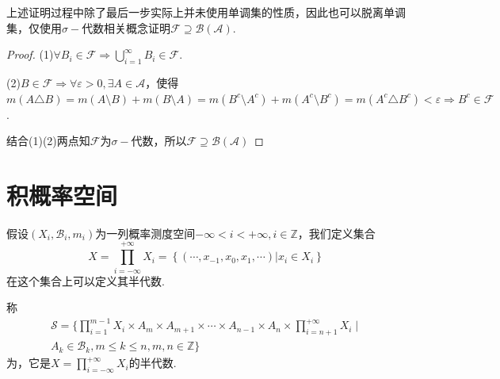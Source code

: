 \begin{remark}
    上述证明过程中除了最后一步实际上并未使用单调集的性质，因此也可以脱离单调集，仅使用$\sigma-\!\!$代数相关概念证明$\mathcal{F} \supseteq \mathcal{B}(\mathcal{A})$.\par
    \begin{proof}
        (1)$\forall B_i \in \mathcal{F} \Rightarrow \bigcup_{i=1}^\infty{B_i} \in \mathcal{F}$.\par
        (2)$B \in \mathcal{F} \Rightarrow \forall \varepsilon>0,\exists A \in \mathcal{A}$，使得$m(A \triangle B)=m(A \setminus B)+m(B \setminus A)=m(B^c \setminus A^c)+m(A^c\setminus B^c)=m(A^c \triangle B^c)<\varepsilon \Rightarrow B^c \in \mathcal{F}$.\par
        结合(1)(2)两点知$\mathcal{F}$为$\sigma-\!\!$代数，所以$\mathcal{F} \supseteq \mathcal{B}(\mathcal{A})$
    \end{proof}
\end{remark}

\section{积概率空间}

假设$(X_i,\mathcal{B}_i,m_i)$为一列概率测度空间$-\infty<i<+\infty,i\in\mathbb{Z}$，我们定义集合
\[X=\prod_{i=-\infty}^{+\infty}{X_i}=\left\{(\cdots,x_{-1},x_0,x_1,\cdots)|x_i \in X_i\right\}\]
在这个集合上可以定义其半代数.
\begin{definition}
    称
    \begin{equation*}
        \begin{split}
            \mathcal{S}=\bigg\{ \prod_{i=1}^{m-1}{X_i} \times A_m \times A_{m+1} \times \cdots \times A_{n-1} \times A_n \times \prod_{i=n+1}^{+\infty}{X_i} \;\bigg|\; \\
            A_k \in \mathcal{B}_k, m \leqslant k \leqslant n, m,n \in \mathbb{Z} \bigg\}
        \end{split}
    \end{equation*}
    为，它是$X=\prod_{i=-\infty}^{+\infty}{X_i}$的半代数.
\end{definition}

